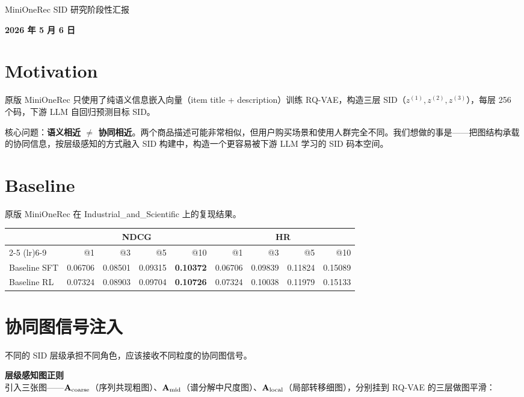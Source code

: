 \documentclass[11pt]{article}
\begin{document}
{\LARGE MiniOneRec SID 研究阶段性汇报}

\vspace{0.6\baselineskip}

\textbf{2026 年 5 月 6 日}

\section{Motivation}

原版 MiniOneRec 只使用了纯语义信息嵌入向量（item title + description）训练 RQ-VAE，构造三层 SID（$z^{(1)}, z^{(2)}, z^{(3)}$），每层 256 个码，下游 LLM 自回归预测目标 SID。

核心问题：\textbf{语义相近 $\neq$ 协同相近}。两个商品描述可能非常相似，但用户购买场景和使用人群完全不同。我们想做的事是——把图结构承载的协同信息，按层级感知的方式融入 SID 构建中，构造一个更容易被下游 LLM 学习的 SID 码本空间。

\section{Baseline}

原版 MiniOneRec 在  Industrial\_and\_Scientific 上的复现结果。

\begin{center}
\begin{tabular}{lrrrrrrrr}
\toprule
& \multicolumn{4}{c}{NDCG} & \multicolumn{4}{c}{HR} \\
\cmidrule(lr){2-5} \cmidrule(lr){6-9}
& @1 & @3 & @5 & @10 & @1 & @3 & @5 & @10 \\
\midrule
Baseline SFT & 0.06706 & 0.08501 & 0.09315 & \textbf{0.10372} & 0.06706 & 0.09839 & 0.11824 & 0.15089 \\
Baseline RL  & 0.07324 & 0.08903 & 0.09704 & \textbf{0.10726} & 0.07324 & 0.10038 & 0.11979 & 0.15133 \\
\bottomrule
\end{tabular}
\end{center}

\section{协同图信号注入}

不同的 SID 层级承担不同角色，应该接收不同粒度的协同图信号。

\medskip
\textbf{层级感知图正则}\\
引入三张图——$\mathbf{A}_{\rm coarse}$（序列共现粗图）、$\mathbf{A}_{\rm mid}$（谱分解中尺度图）、$\mathbf{A}_{\rm local}$（局部转移细图），分别挂到 RQ-VAE 的三层做图平滑：
\end{document}
